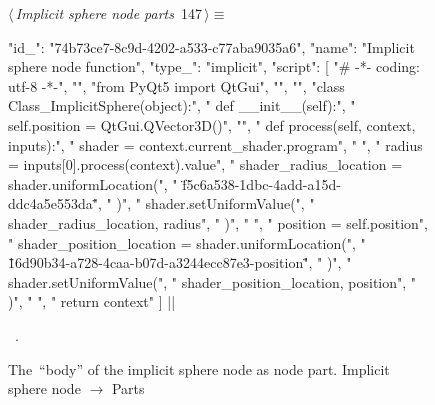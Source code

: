 \documentclass[%
    a4paper,    %
    justified,  %
    nobib,      %
    openany     %
]{tufte-book}
\makeatletter
\renewcommand{\label}[1]{\@tufte@label{##1}}%
\makeatother
\begin{document}
\begin{figure}[!htbp]
\begin{flushleft} \small
\begin{minipage}{\linewidth}\label{scrap103}\raggedright\small
{} $\langle\,${\itshape Implicit sphere node parts}\nobreak\ {\footnotesize {147}}$\,\rangle\equiv$
\vspace{-1ex}
\begin{pythoncode}
{
    "id_": "74b73ce7-8c9d-4202-a533-c77aba9035a6",
    "name": "Implicit sphere node function",
    "type_": "implicit",
    "script": [
        "# -*- coding: utf-8 -*-",
        "",
        "from PyQt5 import QtGui",
        "",
        "",
        "class Class_ImplicitSphere(object):",
        "    def __init__(self):",
        "        self.position = QtGui.QVector3D()",
        "",
        "    def process(self, context, inputs):",
        "        shader = context.current_shader.program",
        "        ",
        "        radius = inputs[0].process(context).value",
        "        shader_radius_location = shader.uniformLocation(",
        "            \"f5c6a538-1dbc-4add-a15d-ddc4a5e553da\"",
        "        )",
        "        shader.setUniformValue(",
        "            shader_radius_location, radius",
        "        )",
        "        ",
        "        position = self.position",
        "        shader_position_location = shader.uniformLocation(",
        "            \"16d90b34-a728-4caa-b07d-a3244ecc87e3-position\"",
        "        )",
        "        shader.setUniformValue(",
        "            shader_position_location, position",
        "        )",
        "        ",
        "        return context"
    ]
}|\NWsep|
\end{pythoncode}
\vspace{1.5ex}
\footnotesize
\begin{list}{}{\setlength{\itemsep}{-\parsep}\setlength{\itemindent}{-\leftmargin}}
\item \NWtxtMacroRefIn\ .

\item{}
\end{list}
\end{minipage}\vspace{4ex}
\end{flushleft}
\caption{The~\enquote{body} of the implicit sphere node as node part.
  \newline{}\newline{}Implicit sphere node $\rightarrow$ Parts}
\end{figure}
\end{document}
